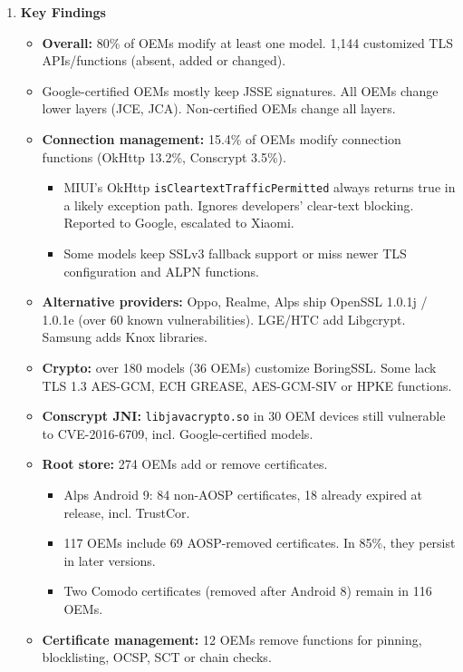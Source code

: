 \documentclass[11pt,a4paper]{article}
\newcommand{\entrypart}[1]{\textbf{\color{accent}#1}\par\vspace{2pt}}
\begin{document}
\begin{enumerate}
    \item \entrypart{Key Findings}

    \begin{itemize}
        \item \textbf{Overall:} 80\% of OEMs modify at least one model. 1,144 customized TLS APIs/functions (absent, added or changed).
        \item Google-certified OEMs mostly keep JSSE signatures. All OEMs change lower layers (JCE, JCA). Non-certified OEMs change all layers.
        \item \textbf{Connection management:} 15.4\% of OEMs modify connection functions (OkHttp 13.2\%, Conscrypt 3.5\%).
        \begin{itemize}
            \item MIUI's OkHttp \texttt{isCleartextTrafficPermitted} always returns true in a likely exception path. Ignores developers' clear-text blocking. Reported to Google, escalated to Xiaomi.
            \item Some models keep SSLv3 fallback support or miss newer TLS configuration and ALPN functions.
        \end{itemize}
        \item \textbf{Alternative providers:} Oppo, Realme, Alps ship OpenSSL 1.0.1j / 1.0.1e (over 60 known vulnerabilities). LGE/HTC add Libgcrypt. Samsung adds Knox libraries.
        \item \textbf{Crypto:} over 180 models (36 OEMs) customize BoringSSL. Some lack TLS 1.3 AES-GCM, ECH GREASE, AES-GCM-SIV or HPKE functions.
        \item \textbf{Conscrypt JNI:} \texttt{libjavacrypto.so} in 30 OEM devices still vulnerable to CVE-2016-6709, incl. Google-certified models.
        \item \textbf{Root store:} 274 OEMs add or remove certificates.
        \begin{itemize}
            \item Alps Android 9: 84 non-AOSP certificates, 18 already expired at release, incl. TrustCor.
            \item 117 OEMs include 69 AOSP-removed certificates. In 85\%, they persist in later versions.
            \item Two Comodo certificates (removed after Android 8) remain in 116 OEMs.
        \end{itemize}
        \item \textbf{Certificate management:} 12 OEMs remove functions for pinning, blocklisting, OCSP, SCT or chain checks.

\end{itemize}
\end{enumerate}
\end{document}
